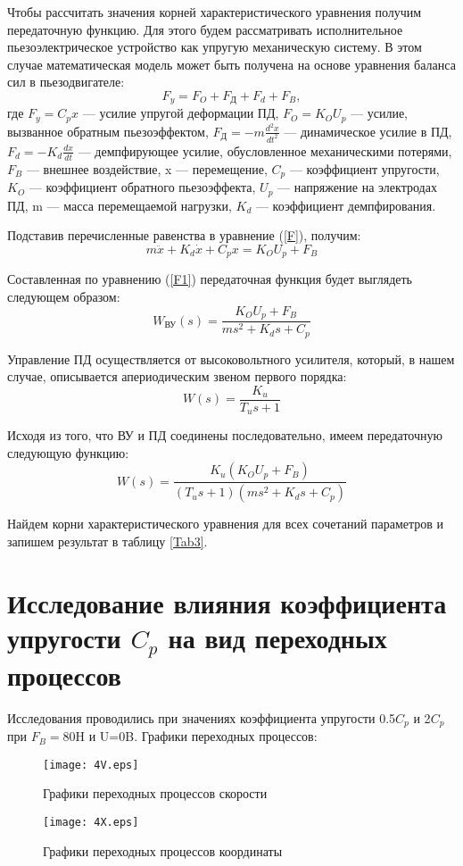 \documentclass[12pt,a4paper]{article}
\begin{document}
Чтобы рассчитать значения корней характеристического уравнения получим передаточную функцию. Для этого будем рассматривать исполнительное пьезоэлектрическое устройство как упругую механическую систему. В этом случае математическая модель может быть получена на основе уравнения баланса сил в пьезодвигателе:  
\begin{equation} 
    F_y = F_O + F_\text{Д} + F_d + F_B,
    \label{F}
\end{equation}
где $F_y=C_px$ --- усилие упругой деформации ПД, $F_O=K_OU_p$ --- усилие, вызванное обратным пьезоэффектом, $F_\text{Д}=-m\displaystyle{\frac{d^2x}{dt^2}}$ --- динамическое усилие в ПД, $F_d=-K_d\displaystyle{\frac{dx}{dt}}$ --- демпфирующее усилие, обусловленное механическими потерями, $F_B$ --- внешнее воздействие, x --- перемещение, $C_p$ --- коэффициент упругости, $K_O$ --- коэффициент обратного пьезоэффекта, $U_p$ --- напряжение на электродах ПД, m --- масса перемещаемой нагрузки, $K_d$ --- коэффициент демпфирования.\par
Подставив перечисленные равенства в уравнение (\ref{F}), получим:
\begin{equation} 
    m\ddot{x} + K_d\dot{x} + C_px = K_OU_p + F_B
    \label{F1}
\end{equation}
\par Составленная по уравнению (\ref{F1}) передаточная функция будет выглядеть следующем образом:
\begin{equation} 
    W_{\text{ВУ}}(s)=\frac{K_OU_p + F_B}{ms^2 + K_ds + C_p}
    \label{FVU}
\end{equation}
\par Управление ПД осуществляется от высоковольтного усилителя, который, в нашем случае, описывается апериодическим звеном первого порядка:
\begin{equation} 
    W(s)=\frac{K_u}{T_us + 1}
\end{equation}
\par Исходя из того, что ВУ и ПД соединены последовательно, имеем передаточную следующую функцию:
\begin{equation} 
    W(s)=\frac{K_u(K_OU_p + F_B)}{(T_us + 1)(ms^2 + K_ds + C_p)}
\end{equation}
\par Найдем корни характеристического уравнения для всех сочетаний параметров и запишем результат в таблицу \ref{Tab3}.

\newpage
\section{Исследование влияния коэффициента упругости $C_p$ на вид переходных процессов}
Исследования проводились при значениях коэффициента упругости 0.5$C_p$ и 2$C_p$ при $F_B=80$H и U=0B. Графики переходных процессов:
\begin{figure}[H]	
	\centering
	\texttt{[image: 4V.eps]}
	\caption{Графики переходных процессов скорости}
\end{figure}	
\begin{figure}[H]
	\centering
	\texttt{[image: 4X.eps]}
	\caption{Графики переходных процессов координаты}
\end{figure}
\end{document}
